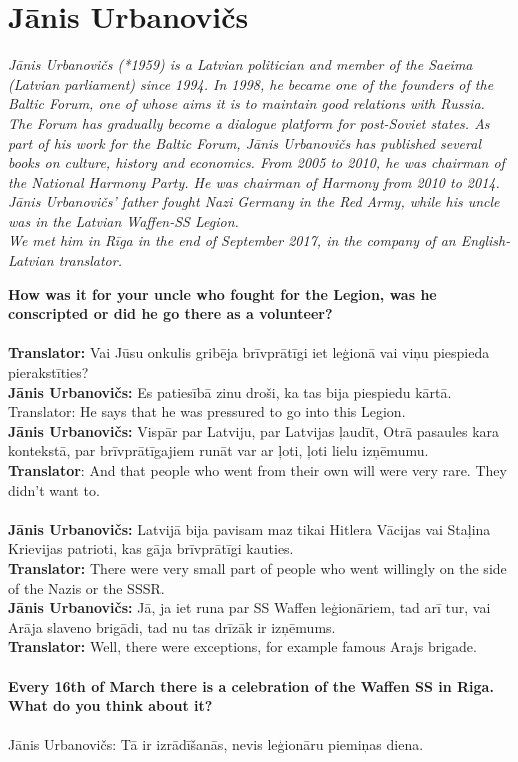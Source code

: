 \section{Jānis Urbanovičs}

\textit{Jānis Urbanovičs (*1959) is a Latvian politician and member of the Saeima (Latvian parliament) since 1994. In 1998, he became one of the founders of the Baltic Forum, one of whose aims it is to maintain good relations with Russia. The Forum has gradually become a dialogue platform for post-Soviet states. As part of his work for the Baltic Forum, Jānis Urbanovičs has published several books on culture, history and economics. From 2005 to 2010, he was chairman of the National Harmony Party. He was chairman of Harmony from 2010 to 2014.\\
Jānis Urbanovičs’ father fought Nazi Germany in the Red Army, while his uncle was in the Latvian Waffen-SS Legion.\\
We met him in Rīga in the end of September 2017, in the company of an English-Latvian translator.}\par
\textbf{How was it for your uncle who fought for the Legion, was he conscripted or did he go there as a volunteer?}\\
\\
\textbf{Translator:} Vai Jūsu onkulis gribēja brīvprātīgi iet leģionā vai viņu piespieda pierakstīties?\\
\textbf{Jānis Urbanovičs:} Es patiesībā zinu droši, ka tas bija piespiedu kārtā.\\
Translator: He says that he was pressured to go into this Legion.\\
\textbf{Jānis Urbanovičs:} Vispār par Latviju, par Latvijas ļaudīt, Otrā pasaules kara kontekstā, par brīvprātīgajiem runāt var ar ļoti, ļoti lielu izņēmumu.\\
\textbf{Translator}: And that people who went from their own will were very rare. They didn’t want to.\\
\\
\textbf{Jānis Urbanovičs:} Latvijā bija pavisam maz tikai Hitlera Vācijas vai Staļina Krievijas patrioti, kas gāja brīvprātīgi kauties. \\
\textbf{Translator:} There were very small part of people who went willingly on the side of the Nazis or the SSSR.\\ 
\textbf{Jānis Urbanovičs:} Jā, ja iet runa par SS Waffen leģionāriem, tad arī tur, vai Arāja slaveno brigādi, tad nu tas drīzāk ir izņēmums.\\
\textbf{Translator:} Well, there were exceptions, for example famous Arajs brigade.\\
\\
\textbf{Every 16th of March there is a celebration of the Waffen SS in Riga. What do you think about it?} \\
\\
Jānis Urbanovičs: Tā ir izrādīšanās, nevis leģionāru piemiņas diena. 

